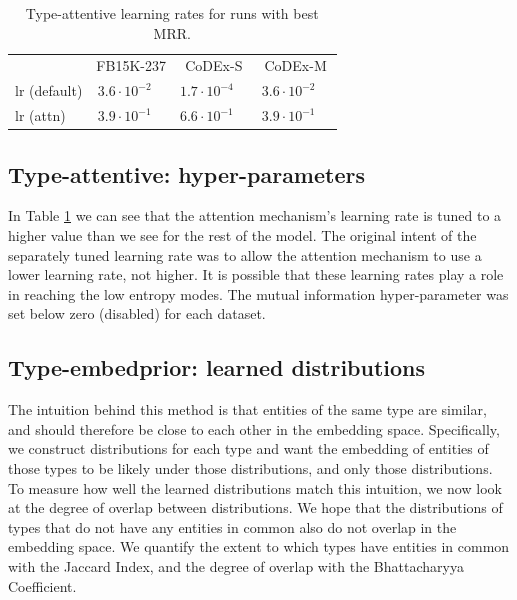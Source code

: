 
\begin{table}%
    \def\fn{\hspace{2pt}} %
    \setlength{\tabcolsep}{5pt}%
    \centering%
    \begin{tabular}{lr@{\fn}lr@{\fn}lr@{\fn}l}%
        \toprule%
                        &\multicolumn{2}{c}{FB15K-237}   %
                                           & \multicolumn{2}{c}{CoDEx-S}   %
                                                                & \multicolumn{2}{c}{CoDEx-M} \\
        \cmidrule{1-7}
        lr (default)    & $3.6 \cdot 10^{-2}$ && $1.7 \cdot 10^{-4}$ && $3.6 \cdot 10^{-2}$ \\
        lr (attn)       & $3.9 \cdot 10^{-1}$ && $6.6 \cdot 10^{-1}$ && $3.9 \cdot 10^{-1}$ \\
        \bottomrule
    \end{tabular} %
    \caption{Type-attentive learning rates for runs with best MRR.} %
    \label{tab:type-attn-lr}%
\end{table}%
%
\subsection{Type-attentive: hyper-parameters}\label{sec:analysis:type_attn_hparams}
In Table \ref{tab:type-attn-lr} we can see that the attention mechanism's learning rate is tuned to a higher value than we see for the rest of the model. 
The original intent of the separately tuned learning rate was to allow the attention mechanism to use a lower learning rate, not higher. It is possible that these learning rates play a role in reaching the low entropy modes.
%
The mutual information hyper-parameter was set below zero (disabled) for each dataset.

\subsection{Type-embedprior: learned distributions} \label{sec:analysis:type_embed_dist}
The intuition behind this method is that entities of the same type are similar, and should therefore be close to each other in the embedding space. Specifically, we construct distributions for each type and want the embedding of entities of those types to be likely under those distributions, and only those distributions.
To measure how well the learned distributions match this intuition, we now look at the degree of overlap between distributions. We hope that the distributions of types that do not have any entities in common also do not overlap in the embedding space.
We quantify the extent to which types have entities in common with the Jaccard Index, and  the degree of overlap with the Bhattacharyya Coefficient.

